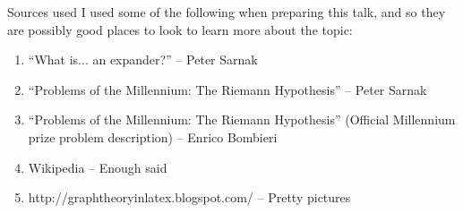 \documentclass{beamer}
\begin{document}
\begin{frame}{Sources used}
I used some of the following when preparing this talk, and so they are possibly good places to look to learn more about the topic:
\begin{enumerate}
\item ``What is... an expander?'' -- Peter Sarnak
\item ``Problems of the Millennium: The Riemann Hypothesis'' -- Peter Sarnak
\item ``Problems of the Millennium: The Riemann Hypothesis'' (Official Millennium prize problem description) -- Enrico Bombieri
\item Wikipedia -- Enough said
\item http://graphtheoryinlatex.blogspot.com/ -- Pretty pictures
\end{enumerate}
\end{frame}
\end{document}
